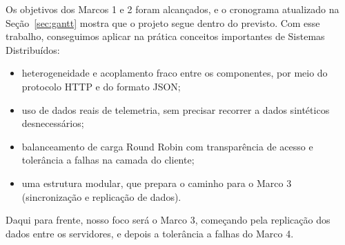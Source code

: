 \documentclass[12pt,a4paper]{article}
\begin{document}
	Os objetivos dos Marcos 1 e 2 foram alcançados, e o cronograma atualizado na Seção~\ref{sec:gantt} mostra que o projeto segue dentro do previsto. Com esse trabalho, conseguimos aplicar na prática conceitos importantes de Sistemas Distribuídos:
	\begin{itemize}
		\item heterogeneidade e acoplamento fraco entre os componentes, por meio do protocolo HTTP e do formato JSON;
		\item uso de dados reais de telemetria, sem precisar recorrer a dados sintéticos desnecessários;
		\item balanceamento de carga Round Robin com transparência de acesso e tolerância a falhas na camada do cliente;
		\item uma estrutura modular, que prepara o caminho para o Marco 3 (sincronização e replicação de dados).
	\end{itemize}
	
	Daqui para frente, nosso foco será o Marco 3, começando pela replicação dos dados entre os servidores, e depois a tolerância a falhas do Marco 4.
	
\end{document}
